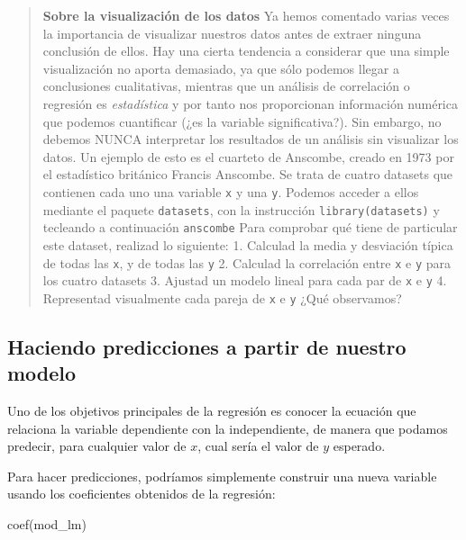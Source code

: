 \documentclass[
  letterpaper,
  DIV=11,
  numbers=noendperiod]{scrreprt}
\newenvironment{Shaded}{\begin{snugshade}}{\end{snugshade}}
\newcommand{\FunctionTok}[1]{\textcolor[rgb]{0.28,0.35,0.67}{#1}}
\newcommand{\NormalTok}[1]{\textcolor[rgb]{0.00,0.23,0.31}{#1}}
\begin{document}
\begin{quote}
\textbf{Sobre la visualización de los datos} Ya hemos comentado varias
veces la importancia de visualizar nuestros datos antes de extraer
ninguna conclusión de ellos. Hay una cierta tendencia a considerar que
una simple visualización no aporta demasiado, ya que sólo podemos llegar
a conclusiones cualitativas, mientras que un análisis de correlación o
regresión es \emph{estadística} y por tanto nos proporcionan información
numérica que podemos cuantificar (¿es la variable significativa?). Sin
embargo, no debemos NUNCA interpretar los resultados de un análisis sin
visualizar los datos. Un ejemplo de esto es el cuarteto de Anscombe,
creado en 1973 por el estadístico británico Francis Anscombe. Se trata
de cuatro datasets que contienen cada uno una variable \texttt{x} y una
\texttt{y}. Podemos acceder a ellos mediante el paquete
\texttt{datasets}, con la instrucción \texttt{library(datasets)} y
tecleando a continuación \texttt{anscombe} Para comprobar qué tiene de
particular este dataset, realizad lo siguiente: 1. Calculad la media y
desviación típica de todas las \texttt{x}, y de todas las \texttt{y} 2.
Calculad la correlación entre \texttt{x} e \texttt{y} para los cuatro
datasets 3. Ajustad un modelo lineal para cada par de \texttt{x} e
\texttt{y} 4. Representad visualmente cada pareja de \texttt{x} e
\texttt{y} ¿Qué observamos?
\end{quote}

\hypertarget{haciendo-predicciones-a-partir-de-nuestro-modelo}{%
\subsection{Haciendo predicciones a partir de nuestro
modelo}\label{haciendo-predicciones-a-partir-de-nuestro-modelo}}

Uno de los objetivos principales de la regresión es conocer la ecuación
que relaciona la variable dependiente con la independiente, de manera
que podamos predecir, para cualquier valor de \(x\), cual sería el valor
de \(y\) esperado.

Para hacer predicciones, podríamos simplemente construir una nueva
variable usando los coeficientes obtenidos de la regresión:

\begin{Shaded}
\begin{Highlighting}[]
\FunctionTok{coef}\NormalTok{(mod\_lm)}
\end{Highlighting}
\end{Shaded}
\end{document}
